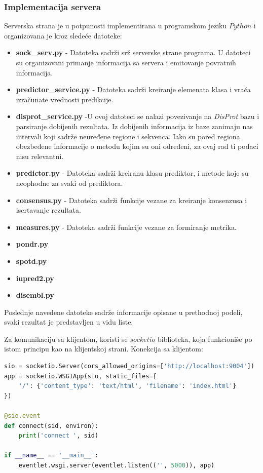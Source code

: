 \subsubsection{Implementacija servera}
Serverska strana je u potpunosti implementirana u programskom jeziku $Python$ i organizovana je kroz sledeće datoteke:
\begin{itemize}
\item \textbf{sock\_serv.py} - Datoteka sadrži srž serverske strane programa. U datoteci su organizovani primanje informacija sa servera i emitovanje povratnih informacija. 
\item \textbf{predictor\_service.py} - Datoteka sadrži kreiranje elemenata klasa i vraća izračunate vrednosti predikcije.  
\item \textbf{disprot\_service.py} -U ovoj datoteci se nalazi povezivanje na   \textit{DisProt} bazu i parsiranje dobijenih rezultata. Iz dobijenih informacija iz baze zanimaju nas intervali koji sadrže neuređene regione i sekvenca. Iako su pored regiona obezbeđene informacije o metodu kojim su oni određeni, za ovaj rad ti podaci nisu relevantni. 
\item \textbf{predictor.py} - Datoteka sadrži kreiranu klasu prediktor, i metode koje su neophodne za svaki od prediktora.  
\item \textbf{consensus.py} - Datoteka sadrži funkcije vezane za kreiranje konsenzusa i iscrtavanje rezultata.
\item \textbf{measures.py} - Datoteka sadrži funkcije vezane za formiranje metrika. 
\item \textbf{pondr.py}  
\item  \textbf{spotd.py}  
\item \textbf{iupred2.py}  
\item \textbf{disembl.py}  
\end{itemize}
Poslednje navedene datoteke sadrže informacije opisane u prethodnoj podeli, svaki rezultat je predstavljen u vidu liste. 

Za komunikaciju sa klijentom, koristi se $socketio$ biblioteka, koja funkcioniše po istom principu kao na klijentskoj strani. Konekcija sa klijentom:

\begin{lstlisting}[language=Python]
sio = socketio.Server(cors_allowed_origins=['http://localhost:9004'])
app = socketio.WSGIApp(sio, static_files={
    '/': {'content_type': 'text/html', 'filename': 'index.html'}
})

@sio.event
def connect(sid, environ):
    print('connect ', sid)
    
if __name__ == '__main__':
    eventlet.wsgi.server(eventlet.listen(('', 5000)), app)
\end{lstlisting}

